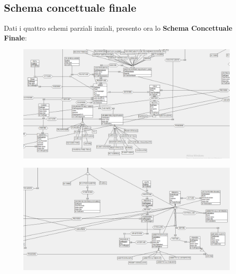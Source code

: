 
\subsection{Schema concettuale finale}

\textsf{\small Dati i quattro schemi parziali inziali, presento ora lo \textbf{Schema Concettuale Finale}:}\\



\begin{figure}
	\includegraphics[width=1.2\textwidth]{./img/Schema_Finale1.png} %
	\caption{}
	\label{fig:s1}
\end{figure}

\begin{figure}
	\includegraphics[width=1.2\textwidth]{./img/Schema_Finale2.png}
	\caption{}
	\label{fig:s2}
\end{figure}

